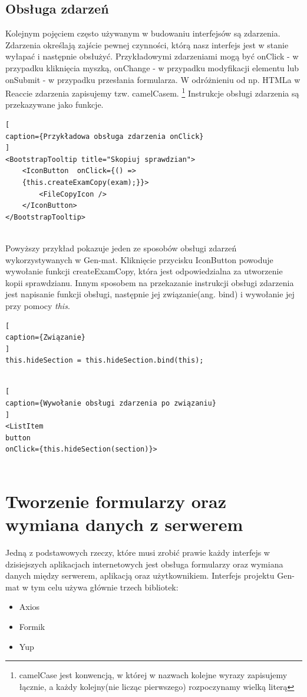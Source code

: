 \documentclass[oneside,polski,logo,indent]{amuthesis}
\begin{document}
\subsection{Obsługa zdarzeń}
{
Kolejnym pojęciem często używanym w budowaniu interfejsów są zdarzenia. Zdarzenia określają zajście pewnej czynności, którą nasz interfejs jest w stanie wyłapać i następnie obsłużyć.
Przykładowymi zdarzeniami mogą być onClick - w przypadku kliknięcia myszką, onChange - w przypadku modyfikacji elementu lub onSubmit - w przypadku przesłania formularza.
W odróżnieniu od np. HTMLa w Reaccie zdarzenia zapisujemy tzw. camelCasem. \footnote{camelCase jest konwencją, w której w nazwach kolejne wyrazy zapisujemy łącznie, a każdy kolejny(nie licząc pierwszego) rozpoczynamy wielką literą}
Instrukcje obsługi zdarzenia są przekazywane jako funkcje.

\begin{lstlisting}[
caption={Przykładowa obsługa zdarzenia onClick}
]
<BootstrapTooltip title="Skopiuj sprawdzian">
	<IconButton  onClick={() => 
	{this.createExamCopy(exam);}}>
		<FileCopyIcon />
	</IconButton>
</BootstrapTooltip>


\end{lstlisting}

}
Powyższy przykład pokazuje jeden ze sposobów obsługi zdarzeń wykorzystywanych w Gen-mat. Kliknięcie przycisku IconButton powoduje wywołanie funkcji createExamCopy, która jest odpowiedzialna za utworzenie kopii sprawdzianu.
Innym sposobem na przekazanie instrukcji obsługi zdarzenia jest napisanie funkcji obsługi, następnie jej związanie(ang. bind) i wywołanie jej przy pomocy {\it this}.

\begin{lstlisting}[
caption={Związanie}
]
this.hideSection = this.hideSection.bind(this);


\end{lstlisting}

\begin{lstlisting}[
caption={Wywołanie obsługi zdarzenia po związaniu}
]
<ListItem
button 
onClick={this.hideSection(section)}>


\end{lstlisting}



\section{Tworzenie formularzy oraz wymiana danych z serwerem}
\bigbreak
Jedną z podstawowych rzeczy, które musi zrobić prawie każdy interfejs w dzisiejszych aplikacjach internetowych jest obsługa formularzy oraz wymiana danych między serwerem, aplikacją oraz użytkownikiem. Interfejs projektu Gen-mat w tym celu używa głównie trzech bibliotek:
\begin{itemize}
\item Axios
\item Formik
\item Yup
\end{itemize}
\end{document}
